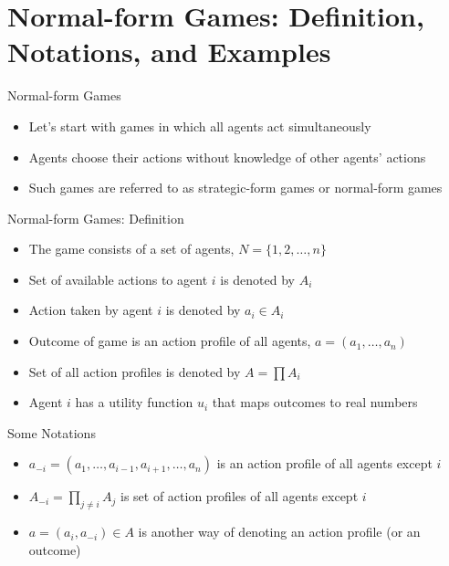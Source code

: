 \documentclass[11pt,aspectratio=169,handout]{beamer}
\subtitle{\vspace{2.1em}Lecture 3: Games in Normal Form}
\begin{document}
 \begin{frame}[plain]
  \titlepage
 \end{frame}
 
 \section{Normal-form Games: Definition, Notations, and Examples}
 
  \begin{frame}{Normal-form Games}
   \begin{itemize}[<+->]  
   \setlength{\itemsep}{1.5em}
    \item Let's start with games in which all agents act simultaneously
    \item Agents choose their actions without knowledge of other agents' actions
    \item Such games are referred to as \alert{strategic-form games} or \alert{normal-form games}
   \end{itemize}
  \end{frame}
  
    \begin{frame}{Normal-form Games: Definition}
   \begin{itemize}[<+->]
   \setlength{\itemsep}{1.5em}
    \item The game consists of a set of agents, $N=\{1,2,\dots,n\}$
    \item Set of available actions to agent $i$ is denoted by $A_i$
    \item Action taken by agent $i$ is denoted by $a_i \in A_i$
    \item Outcome of game is an \alert{action profile} of all agents, $a = (a_1,\dots,a_n)$
    \item Set of all action profiles is denoted by $A = \prod A_i$
    \item Agent $i$ has a utility function $u_i$ that maps outcomes to real numbers
   \end{itemize}
  \end{frame}
  
  \begin{frame}{Some Notations}
   \begin{itemize}
   \setlength{\itemsep}{1.5em}
    \item $a_{-i} = (a_1,\dots,a_{i-1},a_{i+1},\dots,a_n)$ is an action profile of all agents except $i$
    \item $A_{-i} = \prod_{j\ne i}A_j$ is set of action profiles of all agents except $i$
    \item $a = (a_i,a_{-i}) \in A$ is another way of denoting an action profile (or an outcome)
   \end{itemize}
  \end{frame}
  
\end{document}
